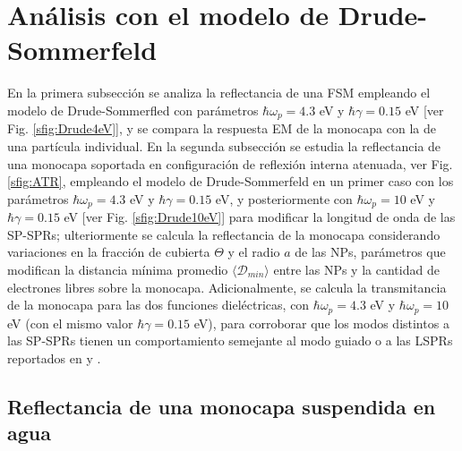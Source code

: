 \section{Análisis con el modelo de Drude-Sommerfeld}
\label{section:Drude}


 En la primera subsección se analiza la reflectancia de una FSM empleando el modelo de Drude-Sommerfled con parámetros $\hbar\omega_p = 4.3$ eV y  $\hbar\gamma = 0.15$ eV [ver Fig. \ref{sfig:Drude4eV}], y se compara la respuesta EM de la monocapa con la de una partícula individual. En la segunda subsección se estudia la reflectancia de una monocapa soportada en configuración de reflexión interna atenuada, ver Fig. \ref{sfig:ATR}, empleando el modelo de Drude-Sommerfeld en un primer caso con los parámetros  $\hbar\omega_p = 4.3$ eV y  $\hbar\gamma = 0.15$ eV, y posteriormente con $\hbar\omega_p = 10$ eV y $\hbar\gamma = 0.15$ eV [ver Fig. \ref{sfig:Drude10eV}] para modificar la longitud de onda de las SP-SPRs; ulteriormente se calcula la reflectancia de la monocapa considerando  variaciones en la fracción de cubierta $\Theta$ y el radio $a$ de las NPs, parámetros que modifican la distancia mínima promedio $\langle\mathscr{D}_{min}\rangle $ entre las NPs y la cantidad de electrones libres sobre la monocapa. Adicionalmente, se calcula la transmitancia de la monocapa para las dos funciones dieléctricas, con $\hbar\omega_p =4.3$ eV y $\hbar\omega_p =10$ eV (con el mismo valor $\hbar\gamma=0.15$ eV), para corroborar que los modos distintos a las SP-SPRs tienen un comportamiento semejante al modo guiado o a las LSPRs reportados en \cite{kabashin2009plasmonic} y \cite{danilov2018ultra}. 
	
	\subsection{Reflectancia de una monocapa suspendida en agua}
	\label{ssection:DrudeFSM}
	
